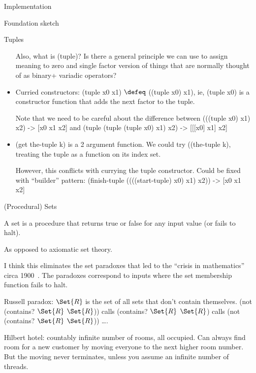\documentclass[11pt]{PalisadesLakesBook}
\begin{document}
\begin{plSection}{Implementation}
\begin{plSection}{Foundation sketch}
\begin{plSection}{Tuples}
\begin{itemize}
  Also, what is {\pseudocodeFont (tuple)}?
  Is there a general principle we can use to assign meaning
  to zero and single factor version of things that are normally 
  thought of as binary+ variadic operators?
  
  \item Curried constructors: 
  {\pseudocodeFont (tuple x0 x1)} 
  $\defeq$ 
  {\pseudocodeFont ((tuple x0) x1)},
  ie, {\pseudocodeFont (tuple x0)} is a constructor function
  that adds the next factor to the tuple.
  
  Note that we need to be careful about the difference between
  {\pseudocodeFont (((tuple x0) x1) x2) -> [x0 x1 x2]}
  and 
  {\pseudocodeFont (tuple (tuple (tuple x0) x1) x2) 
  -> [[[x0] x1] x2]}
  
  \item {\pseudocodeFont (get the-tuple k)}
   is a 2 argument function.
  We could try {\pseudocodeFont ((the-tuple k)}, treating the
  tuple as a function on its index set.
  
  However, this conflicts with currying the tuple constructor.
  Could be fixed with ``builder'' pattern:
  {\pseudocodeFont (finish-tuple ((((start-tuple) x0) x1) x2)) 
  -> [x0 x1 x2]}
  
\end{itemize}

\end{plSection}%
\begin{plSection}{(Procedural) Sets} 

A set is a procedure that returns true or false for any input
value (or fails to halt).

As opposed to axiomatic set theory.

I think this eliminates the set paradoxes
that led to the ``crisis in mathematics'' circa 1900~\cite{
Feferman:2000:ConstructivePredicativeClassicalAnalysis,
Ferreiros:2008:Crisis}.
The paradoxes correspond to inputs where the set membership
function fails to halt.

Russell paradox: 
$\Set{R}$ is the set of all sets that don't contain themselves.
{\pseudocodeFont (not (contains? $\Set{R}$ $\Set{R}$))}
calls 
{\pseudocodeFont (contains? $\Set{R}$ $\Set{R}$)}
calls
{\pseudocodeFont (not (contains? $\Set{R}$ $\Set{R}$))}
{\ldots}.

Hilbert hotel: countably infinite number of rooms, all occupied.
Can always find room for a new customer by moving everyone
to the next higher room number.
But the moving never terminates, 
unless you assume an infinite number of threads.


\end{plSection}
\end{plSection}
\end{plSection}
\end{document}
